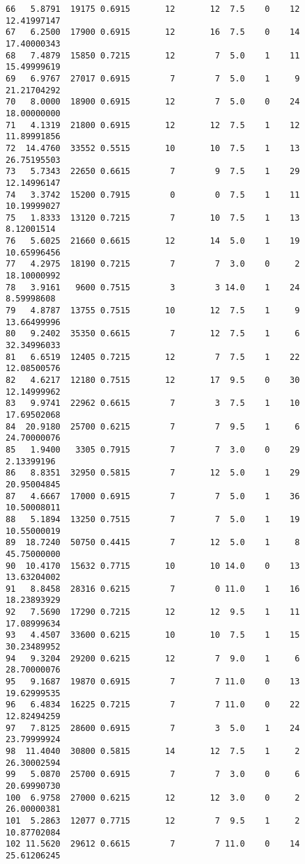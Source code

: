\documentclass[
  letterpaper,
  DIV=11,
  numbers=noendperiod]{scrreprt}
\begin{document}
\begin{verbatim}
66   5.8791  19175 0.6915       12       12  7.5    0    12 12.41997147
67   6.2500  17900 0.6915       12       16  7.5    0    14 17.40000343
68   7.4879  15850 0.7215       12        7  5.0    1    11 15.49999619
69   6.9767  27017 0.6915        7        7  5.0    1     9 21.21704292
70   8.0000  18900 0.6915       12        7  5.0    0    24 18.00000000
71   4.1319  21800 0.6915       12       12  7.5    1    12 11.89991856
72  14.4760  33552 0.5515       10       10  7.5    1    13 26.75195503
73   5.7343  22650 0.6615        7        9  7.5    1    29 12.14996147
74   3.3742  15200 0.7915        0        0  7.5    1    11 10.19999027
75   1.8333  13120 0.7215        7       10  7.5    1    13  8.12001514
76   5.6025  21660 0.6615       12       14  5.0    1    19 10.65996456
77   4.2975  18190 0.7215        7        7  3.0    0     2 18.10000992
78   3.9161   9600 0.7515        3        3 14.0    1    24  8.59998608
79   4.8787  13755 0.7515       10       12  7.5    1     9 13.66499996
80   9.2402  35350 0.6615        7       12  7.5    1     6 32.34996033
81   6.6519  12405 0.7215       12        7  7.5    1    22 12.08500576
82   4.6217  12180 0.7515       12       17  9.5    0    30 12.14999962
83   9.9741  22962 0.6615        7        3  7.5    1    10 17.69502068
84  20.9180  25700 0.6215        7        7  9.5    1     6 24.70000076
85   1.9400   3305 0.7915        7        7  3.0    0    29  2.13399196
86   8.8351  32950 0.5815        7       12  5.0    1    29 20.95004845
87   4.6667  17000 0.6915        7        7  5.0    1    36 10.50008011
88   5.1894  13250 0.7515        7        7  5.0    1    19 10.55000019
89  18.7240  50750 0.4415        7       12  5.0    1     8 45.75000000
90  10.4170  15632 0.7715       10       10 14.0    0    13 13.63204002
91   8.8458  28316 0.6215        7        0 11.0    1    16 18.23893929
92   7.5690  17290 0.7215       12       12  9.5    1    11 17.08999634
93   4.4507  33600 0.6215       10       10  7.5    1    15 30.23489952
94   9.3204  29200 0.6215       12        7  9.0    1     6 28.70000076
95   9.1687  19870 0.6915        7        7 11.0    0    13 19.62999535
96   6.4834  16225 0.7215        7        7 11.0    0    22 12.82494259
97   7.8125  28600 0.6915        7        3  5.0    1    24 23.79999924
98  11.4040  30800 0.5815       14       12  7.5    1     2 26.30002594
99   5.0870  25700 0.6915        7        7  3.0    0     6 20.69990730
100  6.9758  27000 0.6215       12       12  3.0    0     2 26.00000381
101  5.2863  12077 0.7715       12        7  9.5    1     2 10.87702084
102 11.5620  29612 0.6615        7        7 11.0    0    14 25.61206245

\end{verbatim}
\end{document}
